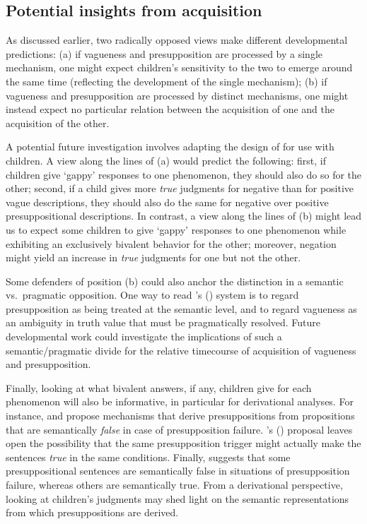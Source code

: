 \documentclass[12pt, letterpaper]{article}
\newcommand\posscite[1]{\citeauthor{#1}'s (\citeyear{#1})}
\begin{document}
{\subsection{Potential insights from acquisition} 

As discussed earlier, two radically opposed views make different developmental predictions: (a) if vagueness and presupposition are processed by a single mechanism, one might expect children's sensitivity to the two to emerge around the same time (reflecting the development of the single mechanism); (b) if vagueness and presupposition are processed by distinct mechanisms, one might instead expect no particular relation between the acquisition of one and the acquisition of the other.

A potential future investigation involves adapting the design of \cite{Zehr:2014} for use with children. A view along the lines of (a) would predict the following: first, if children give `gappy' responses to one phenomenon, they should also do so for the other; second, if a child gives more \textit{true} judgments for negative than for positive vague descriptions, they should also do the same for negative over positive presuppositional descriptions. In contrast, a view along the lines of (b) might lead us to expect some children to give `gappy' responses to one phenomenon while exhibiting an exclusively bivalent behavior for the other; moreover, negation might yield an increase in \textit{true} judgments for one but not the other.

Some defenders of position (b) could also anchor the distinction in a semantic vs.~pragmatic opposition. One way to read \posscite{spector2015:7valued} system is to regard presupposition as being treated at the semantic level, and to regard vagueness as an ambiguity in truth value that must be pragmatically resolved. Future developmental work could investigate the implications of such a semantic/pragmatic divide for the relative timecourse of acquisition of vagueness and presupposition.

Finally, looking at what bivalent answers, if any, children give for each phenomenon will also be informative, in particular for derivational analyses. For instance, \cite{Abusch:2002} and \cite{Romoli:2014} propose mechanisms that derive presuppositions from propositions that are semantically \textit{false} in case of presupposition failure. \posscite{Schlenker:2009} proposal leaves open the possibility that the same presupposition trigger might actually make the sentences \textit{true} in the same conditions. Finally, \cite{sudo2012:phd} suggests that some presuppositional sentences are semantically false in situations of presupposition failure, whereas others are semantically true. From a derivational perspective, looking at children's judgments may shed light on the semantic representations from which presuppositions are derived.

}
\end{document}
